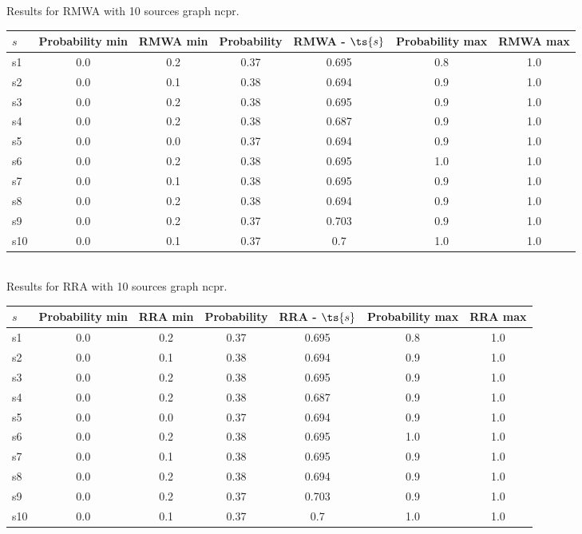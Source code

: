 \documentclass{article}
\begin{document}
\noindent Results for RMWA with 10 sources graph ncpr.

\noindent\begin{tabular}{|l|c|c|c|c|c|c|}
\hline
$s$& Probability min & RMWA min & Probability & RMWA - $\ts{s}$ & Probability max & RMWA max\\
\hline
s1 &0.0 & 0.2 & 0.37 & 0.695 & 0.8 & 1.0\\
\hline
s2 &0.0 & 0.1 & 0.38 & 0.694 & 0.9 & 1.0\\
\hline
s3 &0.0 & 0.2 & 0.38 & 0.695 & 0.9 & 1.0\\
\hline
s4 &0.0 & 0.2 & 0.38 & 0.687 & 0.9 & 1.0\\
\hline
s5 &0.0 & 0.0 & 0.37 & 0.694 & 0.9 & 1.0\\
\hline
s6 &0.0 & 0.2 & 0.38 & 0.695 & 1.0 & 1.0\\
\hline
s7 &0.0 & 0.1 & 0.38 & 0.695 & 0.9 & 1.0\\
\hline
s8 &0.0 & 0.2 & 0.38 & 0.694 & 0.9 & 1.0\\
\hline
s9 &0.0 & 0.2 & 0.37 & 0.703 & 0.9 & 1.0\\
\hline
s10 &0.0 & 0.1 & 0.37 & 0.7 & 1.0 & 1.0\\
\hline
\end{tabular}\\

\noindent Results for RRA with 10 sources graph ncpr.

\noindent\begin{tabular}{|l|c|c|c|c|c|c|}
\hline
$s$& Probability min & RRA min & Probability & RRA - $\ts{s}$ & Probability max & RRA max\\
\hline
s1 &0.0 & 0.2 & 0.37 & 0.695 & 0.8 & 1.0\\
\hline
s2 &0.0 & 0.1 & 0.38 & 0.694 & 0.9 & 1.0\\
\hline
s3 &0.0 & 0.2 & 0.38 & 0.695 & 0.9 & 1.0\\
\hline
s4 &0.0 & 0.2 & 0.38 & 0.687 & 0.9 & 1.0\\
\hline
s5 &0.0 & 0.0 & 0.37 & 0.694 & 0.9 & 1.0\\
\hline
s6 &0.0 & 0.2 & 0.38 & 0.695 & 1.0 & 1.0\\
\hline
s7 &0.0 & 0.1 & 0.38 & 0.695 & 0.9 & 1.0\\
\hline
s8 &0.0 & 0.2 & 0.38 & 0.694 & 0.9 & 1.0\\
\hline
s9 &0.0 & 0.2 & 0.37 & 0.703 & 0.9 & 1.0\\
\hline
s10 &0.0 & 0.1 & 0.37 & 0.7 & 1.0 & 1.0\\
\hline
\end{tabular}\\
\end{document}
